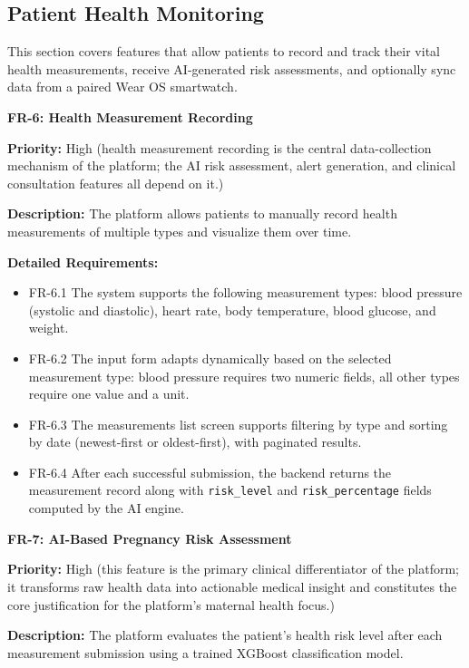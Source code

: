 \subsection{Patient Health Monitoring}

This section covers features that allow patients to record and track their vital health
measurements, receive AI-generated risk assessments, and optionally sync data from
a paired Wear OS smartwatch.

\textbf{FR-6: Health Measurement Recording}

\textbf{Priority:} High (health measurement recording is the central data-collection mechanism of the platform; the AI risk assessment, alert generation, and clinical consultation features all depend on it.)

\textbf{Description:} The platform allows patients to manually record health measurements
of multiple types and visualize them over time.

\textbf{Detailed Requirements:}
\begin{itemize}
    \item FR-6.1 \; The system supports the following measurement types: blood pressure
    (systolic and diastolic), heart rate, body temperature, blood glucose, and weight.
    \item FR-6.2 \; The input form adapts dynamically based on the selected measurement
    type: blood pressure requires two numeric fields, all other types require
    one value and a unit.
    \item FR-6.3 \; The measurements list screen supports filtering by type and sorting
    by date (newest-first or oldest-first), with paginated results.
    \item FR-6.4 \; After each successful submission, the backend returns the measurement
    record along with \texttt{risk\_level} and \texttt{risk\_percentage} fields computed
    by the AI engine.
\end{itemize}

\medskip

\textbf{FR-7: AI-Based Pregnancy Risk Assessment}

\textbf{Priority:} High (this feature is the primary clinical differentiator of the platform; it transforms raw health data into actionable medical insight and constitutes the core justification for the platform's maternal health focus.)

\textbf{Description:} The platform evaluates the patient's health risk level after each
measurement submission using a trained XGBoost classification model.

